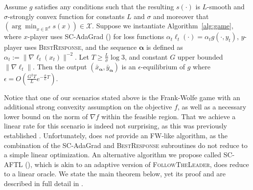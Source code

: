 \documentclass[final,12pt]{colt2018} %
\def\reals{\mathbb{R}}
\def\reals{\mathbb{R}}
\def\balpha{\boldsymbol{\alpha}}
\def\FTL{\textsc{FollowTheLeader}\xspace}
\def\BR{\textsc{BestResponse}\xspace}
\newcommand{\yx}[1]{y_{#1}}
\newcommand{\XX}{\mathcal{X}}
\newcommand{\pr}[1]{\left(#1\right)}
\begin{document}
\begin{theorem}\label{thm:linear-rate}
Assume $g$ satisfies any conditions such that the resulting $s(\cdot)$ is $L$-smooth and $\sigma$-strongly convex function for constants $L$ and $\sigma$ and moreover that $(\arg\min_{x\in \reals^d} s(x)) \in \XX$. Suppose we instantiate Algorithm~\ref{alg:game}, where $x$-player uses SC-AdaGrad () for loss functions $\alpha_t \ell_t(\cdot) = \alpha_t g(\cdot, y_t)$, $y$-player uses \BR, and the sequence $\balpha$ is defined as $\alpha_t := \| \nabla \ell_t(x_t) \|^{-2}$. Let $T \geq \frac L \sigma \log 3$, and constant $G$ upper bounded $\|\nabla \ell_t\|$. Then the output $(\bar x_{\balpha}, \bar y_{\balpha})$ is an $\epsilon$-equilibrium of $g$ where $\epsilon = O\pr{\frac{G^2 T}{L}e^{-\frac{\sigma}{L}T}}$.
\end{theorem}


Notice that one of our scenarios stated above is the Frank-Wolfe game with an additional strong convexity assumption on the objective $f$, as well as a necessary lower bound on the norm of $\nabla f$ within the feasible region. That we achieve a linear rate for this scenario is indeed not surprising, as this was previously established \citep{LP66,DR70,D79}. Unfortunately,  does \emph{not} provide an FW-like algorithm, as the combination of the SC-AdaGrad and \BR subroutines do not reduce to a simple linear optimization. An alternative algorithm we propose called SC-AFTL (), which is akin to an adaptive version of \FTL, does reduce to a linear oracle. We state the main theorem below, yet its proof and  are described in full detail in . 


\end{document}
